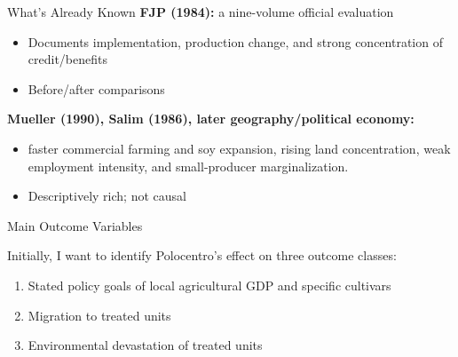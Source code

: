\documentclass[aspectratio=169]{beamer}
\begin{document}
\begin{frame}{What's Already Known}
\textbf{FJP (1984):} a nine-volume official evaluation
 \begin{itemize}
    \item Documents implementation, production change, and strong concentration of credit/benefits
    \item Before/after comparisons
 \end{itemize}

\textbf{Mueller (1990), Salim (1986), later geography/political economy:}
 \begin{itemize}
    \item faster commercial farming and soy expansion, rising land concentration, weak employment intensity, and small-producer marginalization.
    \item Descriptively  rich; not causal
 \end{itemize}


\end{frame}

\begin{frame}{Main Outcome Variables}

Initially, I want to identify Polocentro's effect on three outcome classes:
\vspace{1em}

\begin{enumerate}
    \item Stated policy goals of local agricultural GDP and specific cultivars
    \vspace{1em}
    \item Migration to treated units
    \vspace{1em}
    \item Environmental devastation of treated units
\end{enumerate}

\end{frame}
\end{document}
